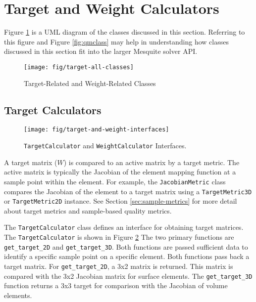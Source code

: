 \documentclass{article}
\begin{document}
\section{Target and Weight Calculators}

Figure \ref{fig:target-all-classes} is a UML diagram of the classes discussed in this section.  Referring to this figure and Figure \ref{fig:qmclass} may help in understanding how classes discussed in this section fit into the larger Mesquite solver API.

\begin{figure}[ptb]
\begin{center}
\texttt{[image: fig/target-all-classes]}
\caption{Target-Related and Weight-Related Classes\label{fig:target-all-classes}}
\end{center}
\end{figure}

\subsection{Target Calculators}

\begin{figure}[htb]
\begin{center}
\texttt{[image: fig/target-and-weight-interfaces]}
\caption{\texttt{TargetCalculator} and \texttt{WeightCalculator} Interfaces.\label{fig:target-iface}}
\end{center}
\end{figure}

A target matrix ($W$) is compared to an active matrix by a target metric.  The active matrix is typically the Jacobian of the element mapping function at a sample point within the element.  For example, the \texttt{JacobianMetric} class compares the Jacobian of the element to a target matrix using a \texttt{TargetMetric3D} or \texttt{TargetMetric2D} instance.  See Section \ref{sec:sample-metrics} for more detail about target metrics and sample-based quality metrics.

The \texttt{TargetCalculator} class defines an interface for obtaining target matrices.  The \texttt{TargetCalculator} is shown in Figure \ref{fig:target-iface} The two primary functions are \texttt{get\_target\_2D} and \texttt{get\_target\_3D}.  Both functions are passed sufficient data to identify a specific sample point on a specific element.  Both functions pass back a target matrix.  For \texttt{get\_target\_2D}, a 3x2 matrix is returned.  This matrix is compared with the 3x2 Jacobian matrix for surface elements.  The \texttt{get\_target\_3D} function returns a 3x3 target for comparison with the Jacobian of volume elements.
\end{document}

